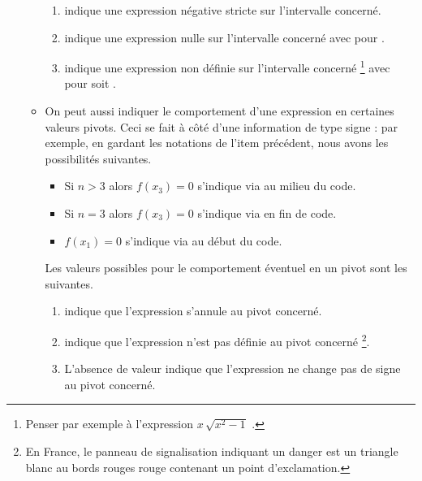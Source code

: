 \documentclass[10pt, a4paper]{article}
\begin{document}
\begin{enumerate}
\begin{itemize}
\begin{enumerate}
            \item \tdocinlatex{-} indique une expression négative stricte sur l'intervalle concerné.

            \item {} indique une expression nulle sur l'intervalle concerné avec  pour .

            \item {} indique une expression non définie sur l'intervalle concerné
            \footnote{
                Penser par exemple à l'expression $x \, \sqrt{x^2 - 1}$ .
            }
            avec  pour  soit .
        \end{enumerate}


        \item On peut aussi indiquer le comportement d'une expression en certaines valeurs pivots. Ceci se fait à côté d'une information de type signe : par exemple, en gardant les notations de l'item précédent, nous avons les possibilités suivantes.
        \begin{itemize}
            \item Si $n > 3$ alors $f(x_3) = 0$ s'indique via  au milieu du code.

            \item Si $n = 3$ alors $f(x_3) = 0$ s'indique via  en fin de code.

            \item $f(x_1) = 0$ s'indique via     au début du code.
        \end{itemize}
        Les valeurs possibles pour le comportement éventuel en un pivot sont les suivantes.
        \begin{enumerate}
            \item {} indique que
l'expression s'annule au pivot concerné.

            \item \tdocinlatex{!} indique que
l'expression n'est pas définie au pivot concerné
            \footnote{
                En France, le panneau de signalisation indiquant un danger est un triangle blanc au bords rouges rouge contenant un point d'exclamation.
            }.

            \item L'absence de valeur indique que l'expression ne change pas de signe au pivot concerné.
        \end{enumerate}
    \end{itemize}
\end{enumerate}
\end{document}
